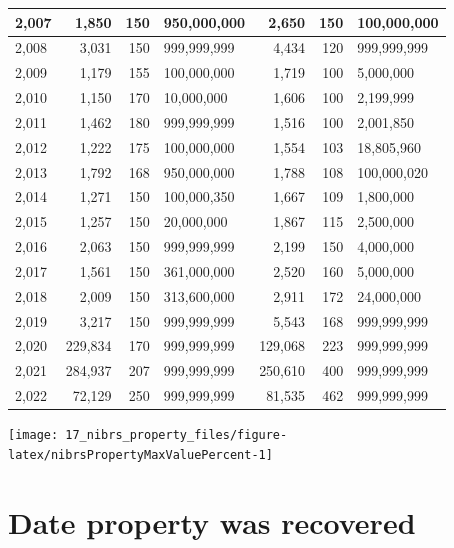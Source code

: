 \documentclass[
]{krantz}
\let\origfigure\figure
\let\endorigfigure\endfigure
\renewenvironment{figure}[1][2] {
    \expandafter\origfigure\expandafter[H]
} {
    \endorigfigure
}
\begin{document}
\begin{longtable}[t]{l|r|r|l|r|r|l}
\hline
2,007 & 1,850 & 150 & 950,000,000 & 2,650 & 150 & 100,000,000\\
\hline
2,008 & 3,031 & 150 & 999,999,999 & 4,434 & 120 & 999,999,999\\
\hline
2,009 & 1,179 & 155 & 100,000,000 & 1,719 & 100 & 5,000,000\\
\hline
2,010 & 1,150 & 170 & 10,000,000 & 1,606 & 100 & 2,199,999\\
\hline
2,011 & 1,462 & 180 & 999,999,999 & 1,516 & 100 & 2,001,850\\
\hline
2,012 & 1,222 & 175 & 100,000,000 & 1,554 & 103 & 18,805,960\\
\hline
2,013 & 1,792 & 168 & 950,000,000 & 1,788 & 108 & 100,000,020\\
\hline
2,014 & 1,271 & 150 & 100,000,350 & 1,667 & 109 & 1,800,000\\
\hline
2,015 & 1,257 & 150 & 20,000,000 & 1,867 & 115 & 2,500,000\\
\hline
2,016 & 2,063 & 150 & 999,999,999 & 2,199 & 150 & 4,000,000\\
\hline
2,017 & 1,561 & 150 & 361,000,000 & 2,520 & 160 & 5,000,000\\
\hline
2,018 & 2,009 & 150 & 313,600,000 & 2,911 & 172 & 24,000,000\\
\hline
2,019 & 3,217 & 150 & 999,999,999 & 5,543 & 168 & 999,999,999\\
\hline
2,020 & 229,834 & 170 & 999,999,999 & 129,068 & 223 & 999,999,999\\
\hline
2,021 & 284,937 & 207 & 999,999,999 & 250,610 & 400 & 999,999,999\\
\hline
2,022 & 72,129 & 250 & 999,999,999 & 81,535 & 462 & 999,999,999\\
\hline
\end{longtable}

\begin{figure}

{\centering \texttt{[image: 17\_nibrs\_property\_files/figure-latex/nibrsPropertyMaxValuePercent-1]} 

}

\caption{Annual percent of the value of all property stolen that is made up of the value that is the maximum dollar amount reported in that year, 1991-2022.}\label{fig:nibrsPropertyMaxValuePercent}
\end{figure}

\section{Date property was
recovered}\label{date-property-was-recovered}
\end{document}
